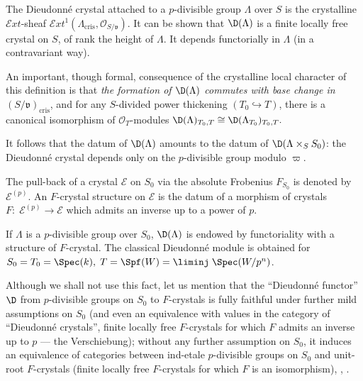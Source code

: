 \begin{para}\label{para:3.2.2}
 The Dieudonn\'e crystal attached to a $p$-divisible group $\Lambda$
 over $S$ is the crystalline $\mathcal{E}xt$-sheaf
 $\mathcal{E}xt^1(\Lambda_{\mathrm{cris}},
 \mathcal{O}_{S/\mathfrak{v}})$. It can be shown that ${\D}(\Lambda)$ is
 a finite locally free crystal on $S$, of rank the height of
 $\Lambda$. It depends functorially in $\Lambda$ (in a contravariant
 way).

 An important, though formal, consequence of the crystalline local
 character of this definition is that {\it the formation of
 ${\D}(\Lambda)$ commutes with base change in}
 $(S/\mathfrak{v})_{\mathrm{cris}}$, and for any $S$-divided power
 thickening $(T_0\hookrightarrow T)$, there is a canonical isomorphism
 of $\mathcal{O}_T$-modules ${\D}(\Lambda)_{T_0,T}\cong
 {\D}(\Lambda_{T_0})_{T_0,T}.$

 It follows that the datum of ${\D}(\Lambda)$ amounts to the datum of
 ${\D}(\Lambda\times_S S_0)$: the Dieudonn\'e crystal depends only on the
 $p$-divisible group modulo $\varpi$.
\end{para}

\begin{para}\label{para:3.2.3}
 The pull-back of a crystal $\mathcal{E}$ on $S_0$ via the absolute
 Frobenius $F_{S_0}$ is denoted by $\mathcal{E}^{(p)}$. An $F$-crystal
 structure on $\mathcal{E}$ is the datum of a morphism of crystals
 $F:\;\mathcal{E}^{(p)}\rightarrow \mathcal{E}$ which admits an inverse
 up to a power of $p$.

 If $\Lambda$ is a $p$-divisible group over $S_0$, ${\D}(\Lambda)$ is
 endowed by functoriality with a structure of $F$-crystal. The classical
 Dieudonn\'e module is obtained for
 $S_0=T_0=\Spec(k),\;T=\Spf(W)=\liminj\;\Spec(W/p^n)$.


 Although we shall not use this fact, let us mention that the
 ``Dieudonn\'e functor'' ${\D}$ from $p$-divisible groups on $S_0$ to
 $F$-crystals is fully faithful under further mild assumptions on $S_0$
 (and even an equivalence with values in the category of ``Dieudonn\'e
 crystals'', \ie finite locally free $F$-crystals for which $F$ admits an
 inverse up to $p$ --- the Verschiebung); without any further assumption on
 $S_0$, it induces an equivalence of categories between ind-etale
 $p$-divisible groups on $S_0$ and unit-root $F$-crystals (\ie finite
 locally free $F$-crystals for which $F$ is an isomorphism), 
 \cf \cite{tddc1}, \cite{jong95:_cryst_dieud}.
\end{para}


